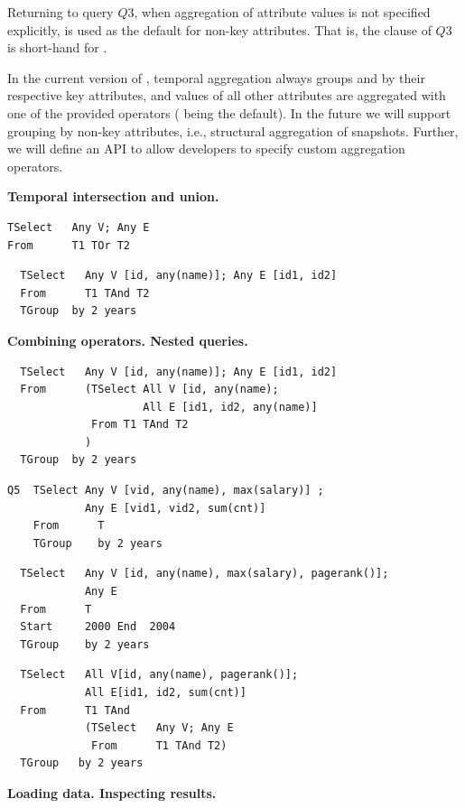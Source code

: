 Returning to query $Q3$, when aggregation of attribute values is not
specified explicitly,  is used as the default for non-key
attributes.  That is, the  clause of $Q3$ is short-hand
for  
.

In the current version of \ql, temporal aggregation always groups
 and  by their respective key attributes, and values
of all other attributes are aggregated with one of the provided
operators ( being the default).  In the future we will
support grouping by non-key attributes, i.e., structural aggregation
of snapshots.  Further, we will define an API to allow developers to
specify custom aggregation operators.

{\bf Temporal intersection and union.}

\begin{verbatim}
TSelect   Any V; Any E
From      T1 TOr T2
\end{verbatim}

\begin{verbatim}
  TSelect   Any V [id, any(name)]; Any E [id1, id2]
  From      T1 TAnd T2
  TGroup  by 2 years
\end{verbatim}

{\bf Combining operators.  Nested queries.}

\begin{verbatim}
  TSelect   Any V [id, any(name)]; Any E [id1, id2]
  From      (TSelect All V [id, any(name); 
                     All E [id1, id2, any(name)]
             From T1 TAnd T2
            )
  TGroup  by 2 years
\end{verbatim}

\begin{verbatim}
Q5  TSelect Any V [vid, any(name), max(salary)] ; 
            Any E [vid1, vid2, sum(cnt)]
    From      T
    TGroup    by 2 years
\end{verbatim}

\begin{verbatim}
  TSelect   Any V [id, any(name), max(salary), pagerank()];
            Any E   
  From      T
  Start     2000 End  2004
  TGroup    by 2 years
\end{verbatim}


\begin{verbatim}
  TSelect   All V[id, any(name), pagerank()]; 
            All E[id1, id2, sum(cnt)]
  From      T1 TAnd  
            (TSelect   Any V; Any E
             From      T1 TAnd T2)
  TGroup   by 2 years
\end{verbatim}

{\bf Loading data.  Inspecting results.}
